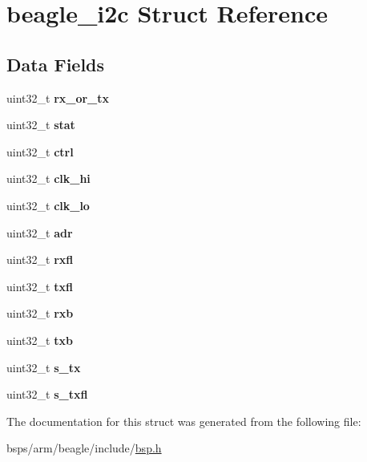 \hypertarget{structbeagle__i2c}{}\section{beagle\+\_\+i2c Struct Reference}
\label{structbeagle__i2c}
\subsection*{Data Fields}
\begin{DoxyCompactItemize}
\item 
\mbox{\label{structbeagle__i2c_a8c78d80e0749f3af0a346807c8ba2e29}} 
uint32\+\_\+t {\bfseries rx\+\_\+or\+\_\+tx}
\item 
\mbox{\label{structbeagle__i2c_a694d6db3a5e98d77451e5d9139372428}} 
uint32\+\_\+t {\bfseries stat}
\item 
\mbox{\label{structbeagle__i2c_a073adbd04b4e9ef3eb89406e2fd05832}} 
uint32\+\_\+t {\bfseries ctrl}
\item 
\mbox{\label{structbeagle__i2c_af3ecdb50ed0d215778048b7acfd0088b}} 
uint32\+\_\+t {\bfseries clk\+\_\+hi}
\item 
\mbox{\label{structbeagle__i2c_a5f7ae8b2806fc7c9001f3f86feab09db}} 
uint32\+\_\+t {\bfseries clk\+\_\+lo}
\item 
\mbox{\label{structbeagle__i2c_aa1f15a15b746fb80cce6837e574286f7}} 
uint32\+\_\+t {\bfseries adr}
\item 
\mbox{\label{structbeagle__i2c_aab8814ceab9c6e9c4e6ce330b79a8384}} 
uint32\+\_\+t {\bfseries rxfl}
\item 
\mbox{\label{structbeagle__i2c_aa672085b7703ca7dc362506c61494f8b}} 
uint32\+\_\+t {\bfseries txfl}
\item 
\mbox{\label{structbeagle__i2c_a4bb4bc21521959e6ed8655fd645e2cd7}} 
uint32\+\_\+t {\bfseries rxb}
\item 
\mbox{\label{structbeagle__i2c_a5de06da7050a5463d7032bd497324a83}} 
uint32\+\_\+t {\bfseries txb}
\item 
\mbox{\label{structbeagle__i2c_a77af146b543049f5f1684da81b7dfe61}} 
uint32\+\_\+t {\bfseries s\+\_\+tx}
\item 
\mbox{\label{structbeagle__i2c_af00c7fe5f2c815953fa9e78c1372a2bf}} 
uint32\+\_\+t {\bfseries s\+\_\+txfl}
\end{DoxyCompactItemize}


The documentation for this struct was generated from the following file\+:\begin{DoxyCompactItemize}
\item 
bsps/arm/beagle/include/\mbox{\hyperlink{bsps_2arm_2beagle_2include_2bsp_8h}{bsp.\+h}}\end{DoxyCompactItemize}
